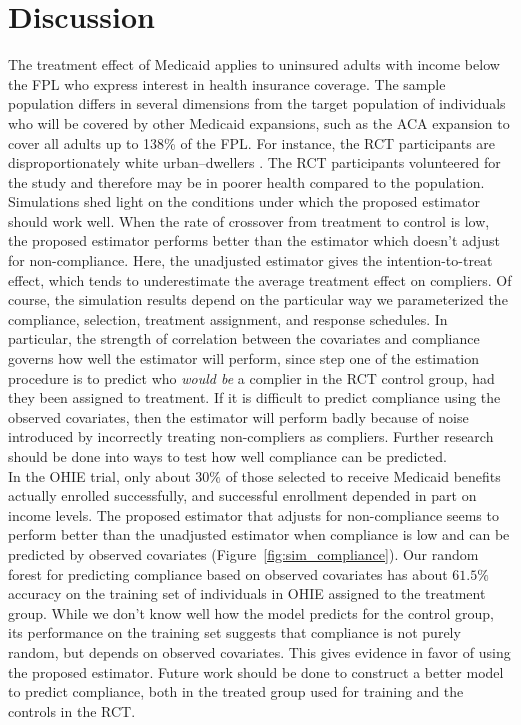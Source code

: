 \documentclass[12pt]{article}
\begin{document}
\section{Discussion}

The treatment effect of Medicaid applies to uninsured adults with income below the FPL who express interest in health insurance coverage. The sample population differs in several dimensions from the target population of individuals who will be covered by other Medicaid expansions, such as the ACA expansion to cover all adults up to 138\% of the FPL. For instance, the RCT participants are disproportionately white urban--dwellers \cite{Taubman}. The RCT participants volunteered for the study and therefore may be in poorer health compared to the population. \\

Simulations shed light on the conditions under which the proposed estimator should work well.  When the rate of crossover from treatment to control is low, the proposed estimator performs better than the estimator which doesn't adjust for non-compliance.  Here, the unadjusted estimator gives the intention-to-treat effect, which tends to underestimate the average treatment effect on compliers. Of course, the simulation results depend on the particular way we parameterized the compliance, selection, treatment assignment, and response schedules.  In particular, the strength of correlation between the covariates and compliance governs how well the estimator will perform, since step one of the estimation procedure is to predict who \textit{would be} a complier in the RCT control group, had they been assigned to treatment. If it is difficult to predict compliance using the observed covariates, then the estimator will perform badly because of noise introduced by incorrectly treating non-compliers as compliers.  Further research should be done into ways to test how well compliance can be predicted. \\

In the OHIE trial, only about $30\%$ of those selected to receive Medicaid benefits actually enrolled successfully, and successful enrollment depended in part on income levels.  The proposed estimator that adjusts for non-compliance seems to perform better than the unadjusted estimator when compliance is low and can be predicted by observed covariates (Figure~\ref{fig:sim_compliance}).  Our random forest for predicting compliance based on observed covariates has about $61.5\%$ accuracy on the training set of individuals in OHIE assigned to the treatment group.  While we don't know well how the model predicts for the control group, its performance on the training set suggests that compliance is not purely random, but depends on observed covariates.  This gives evidence in favor of using the proposed estimator.  Future work should be done to construct a better model to predict compliance, both in the treated group used for training and the controls in the RCT. \\
\end{document}
